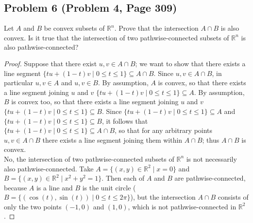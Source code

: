 \documentclass{article}
\begin{document}
\subsection*{Problem 6 (Problem 4, Page 309)}
Let $A$ and $B$ be convex subsets of $\mathbb{R}^n$. Prove that the intersection $A \cap B$ is also convex. Is it true that the intersection of two pathwise-connected subsets of $\mathbb{R}^n$ is also pathwise-connected?
\begin{proof}
Suppose that there exist $u, v \in A \cap B$; we want to show that there exists a line segment $\{tu + (1-t)v \mid 0 \leq t \leq 1\} \subseteq A \cap B$. Since $u, v \in A \cap B$, in particular $u, v \in A$ and $u, v \in B$. By assumption, $A$ is convex, so that there exists a line segment joining $u$ and $v$ $\{tu + (1-t)v \mid 0 \leq t \leq 1\} \subseteq A$. By assumption, $B$ is convex too, so that there exists a line segment joining $u$ and $v$ $\{tu + (1-t)v \mid 0 \leq t \leq 1\} \subseteq B$. Since $\{tu + (1-t)v \mid 0 \leq t \leq 1\} \subseteq A$ and $\{tu + (1-t)v \mid 0 \leq t \leq 1\} \subseteq B$, it follows that $\{tu + (1-t)v \mid 0 \leq t \leq 1\} \subseteq A\cap B$, so that for any arbitrary points $u, v \in A \cap B$ there exists a line segment joining them within $A \cap B$; thus $A \cap B$ is convex. \\
No, the intersection of two pathwise-connected subsets of $\mathbb{R}^n$ is not necessarily also pathwise-connected. Take $A = \{(x, y) \in \mathbb{R}^2 \mid x = 0\}$ and $B = \{(x, y) \in \mathbb{R}^2 \mid x^2+y^2 = 1\}$. Then each of $A$ and $B$ are pathwise-connected, because $A$ is a line and $B$ is the unit circle ($B = \{(\cos{(t)}, \sin{(t)}) \mid 0 \leq t \leq 2\pi\}$), but the intersection $A \cap B$ consists of only the two points $(-1, 0)$ and $(1, 0)$, which is not pathwise-connected in $\mathbb{R}^2$.

\end{proof}
\end{document}
